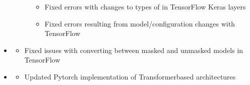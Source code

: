 \documentclass[letterpaper,10pt,english]{sphinxmanual}
\begin{document}
\begin{itemize}
\begin{description}
\begin{itemize}
\item {} 
\sphinxAtStartPar
Fixed errors with changes to types of  in TensorFlow Keras layers

\item {} 
\sphinxAtStartPar
Fixed errors resulting from model/configuration changes with TensorFlow

\end{itemize}

\end{description}

\item {} \begin{description}
\begin{itemize}
\item {} 
\sphinxAtStartPar
Fixed issues with converting between masked and unmasked models in TensorFlow

\end{itemize}

\end{description}

\item {} \begin{description}
\begin{itemize}
\item {} 
\sphinxAtStartPar
Updated Pytorch implementation of Transformer\sphinxhyphen{}based architectures

\end{itemize}

\end{description}

\end{itemize}
\end{document}
